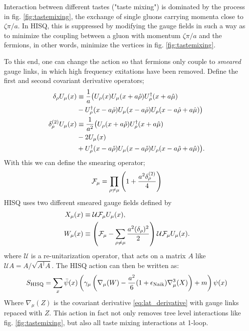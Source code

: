 Interaction between different tastes ("taste mixing") is dominated by the process in fig. \ref{fig:tastemixing}, the exchange of single gluons carrying momenta close to $\zeta \pi/a$. In HISQ, this is suppressed by modifying the gauge fields in such a way as to minimize the coupling between a gluon with momentum ${\zeta\pi/a}$ and the fermions, in other words, minimize the vertices in fig. \ref{fig:tastemixing}.

To this end, one can change the action so that fermions only couple to {\textit{smeared}} gauge links, in which high frequency exitations have been removed. Define the first and second covariant derivative operators;
\begin{align}
	\nonumber
	\delta_{\rho}U_{\mu}(x) & \equiv {1\over a} \big( U_{\rho} (x) U_{\mu} (x + a\hat{\rho}) U_{\rho}^{\dagger}(x+a\hat{\mu}) \\
	& - U_{\rho}^{\dagger}(x-a\hat{\rho})U_{\mu}(x-a\hat{\rho})U_{\rho}(x-a\hat{\rho}+a\hat{\mu})\big)  \\
	\nonumber
	\delta_{\rho}^{(2)} U_{\mu}(x) & \equiv {1\over a^2} \big( U_{\rho}(x+a\hat{\rho})U^{\dagger}_{\rho}(x+a\hat{\mu}) \\
	\nonumber	
	& - 2U_{\mu}(x) \\
	& + U_{\rho}^{\dagger}(x-a\hat{\rho})U_{\mu}(x-a\hat{\rho})U_{\rho}(x - a\hat{\rho} + a\hat{\mu}) \big).
\end{align}
With this we can define the smearing operator;
\begin{align}
	\mathcal{F}_{\mu} = \prod_{\rho\neq\mu} \left( 1 + {a^2 \delta^{(2)}_{\rho}\over 4} \right)
\end{align}
HISQ uses two different smeared gauge fields defined by
\begin{align}
	X_{\mu}(x) &\equiv \mathcal{U} \mathcal{F}_{\mu} U_{\mu}(x), \\
	W_{\mu}(x) &\equiv \left(\mathcal{F}_{\mu} - \sum_{\rho\neq\mu}{a^2(\delta_{\rho})^2\over 2} \right) \mathcal{U} \mathcal{F}_{\mu} U_{\mu}(x).
	\label{eq:gaugesmearing}
\end{align}
where $\mathcal{U}$ is a re-unitarization operator, that acts on a matrix $A$ like $\mathcal{U}A = A/\sqrt{A^{\dagger}A}$. The HISQ action can then be written as:
\begin{align}
	S_{\text{HISQ}} = \sum_{x} \bar{\psi}(x) \left( \gamma_{\mu} \left( \nabla_{\mu}(W) - {a^2\over 6}(1+\epsilon_{\text{Naik}})\nabla^3_{\mu}(X) \right) + m \right) \psi(x)
\end{align}
Where $\nabla_{\mu}(Z)$ is the covariant derivative \eqref{eq:lat_derivative} with gauge links repaced with $Z$. This action in fact not only removes tree level interactions like fig. \ref{fig:tastemixing}, but also all taste mixing interactions at 1-loop.


